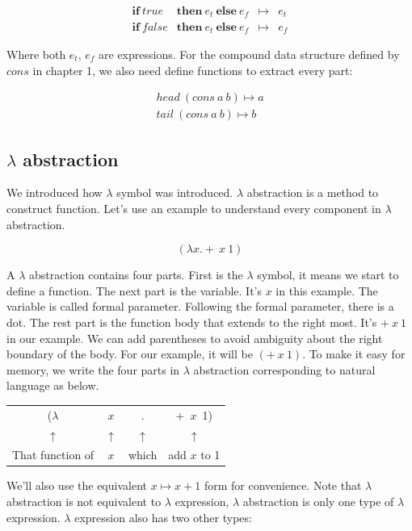 \documentclass{article}
\begin{document}
\[
\begin{array}{llcl}
\textbf{if}\ true\! & \textbf{then}\ e_t\ \textbf{else}\ e_f & \mapsto & e_t \\
\textbf{if}\ false\! & \textbf{then}\ e_t\ \textbf{else}\ e_f & \mapsto & e_f
\end{array}
\]

Where both $e_t$, $e_f$ are expressions. For the compound data structure defined by $cons$ in chapter 1, we also need define functions to extract every part:

\[
\begin{array}{l}
head\ (cons\ a\ b) \mapsto a \\
tail\ (cons\ a\ b) \mapsto b
\end{array}
\]

\subsection{$\lambda$ abstraction}

We introduced how $\lambda$ symbol was introduced. $\lambda$ abstraction is a method to construct function. Let's use an example to understand every component in $\lambda$ abstraction.

\[
(\lambda x . +\ x\ 1)
\]

A $\lambda$ abstraction contains four parts. First is the $\lambda$ symbol, it means we start to define a function. The next part is the variable. It's $x$ in this example. The variable is called formal parameter. Following the formal parameter, there is a dot. The rest part is the function body that extends to the right most. It's $+\ x\ 1$ in our example. We can add parentheses to avoid ambiguity about the right boundary of the body. For our example, it will be $(+\ x\ 1)$. To make it easy for memory, we write the four parts in $\lambda$ abstraction corresponding to natural language as below.

\vspace{5mm}
\begin{tabular}{cccc}
($\lambda$ & $x$ & . & +\  $x$\ 1) \\
$\uparrow$ & $\uparrow$ & $\uparrow$ & $\uparrow$ \\
That function of & $x$ & which & add $x$ to 1 \\
\end{tabular}
\vspace{5mm}

We'll also use the equivalent $x \mapsto x + 1$ form for convenience. Note that $\lambda$ abstraction is not equivalent to $\lambda$ expression, $\lambda$ abstraction is only one type of $\lambda$ expression. $\lambda$ expression also has two other types:
\end{document}
